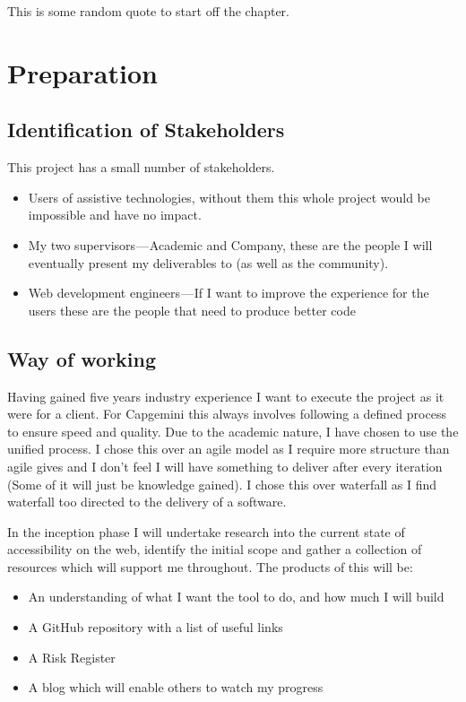 \begin{savequote}[75mm]
This is some random quote to start off the chapter.
\end{savequote}

\chapter{Preparation}

\section{Identification of Stakeholders}
This project has a small number of stakeholders.
\begin{itemize}
  \item Users of assistive technologies, without them this whole project would be impossible and have no impact.
  \item My two supervisors — Academic and Company, these are the people I will eventually present my deliverables to (as well as the
  community).
  \item Web development engineers — If I want to improve the experience for the users these are the people that need to produce better code
\end{itemize}

\section{Way of working}
Having gained five years industry experience I want to execute the project as it were for a client. For Capgemini this always involves
following a defined process to ensure speed and quality. Due to the academic nature, I have chosen to use the unified process. I chose this
over an agile model as I require more structure than agile gives and I don't feel I will have something to deliver after every iteration
(Some of it will just be knowledge gained). I chose this over waterfall as I find waterfall too directed to the delivery of a software.


In the inception phase I will undertake research into the current state of accessibility on the web, identify the initial scope and gather
a collection of resources which will support me throughout. The products of this will be:
\begin{itemize}
  \item An understanding of what I want the tool to do, and how much I will build
  \item A GitHub repository with a list of useful links
  \item A Risk Register
  \item A blog which will enable others to watch my progress
\end{itemize}

